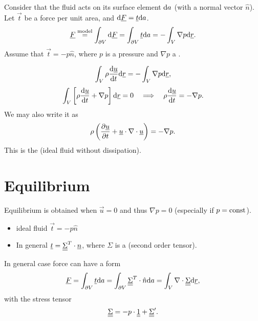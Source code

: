 \documentclass[../main.tex]{subfiles}
\begin{document}
    Consider that the fluid acts on its surface element $\mathrm{d} a$ (with a normal vector $\hat n$).
    Let $\vec t$ be a force per unit area, and $\mathrm{d} \underline{F} = \underline{t} \mathrm{d} a$.
    \begin{displaymath}
      \underline{F} \overset{\textrm{model}}{=} \int_{\partial V} \mathrm{d} \underline{F} 
      = \int_{\partial V}  \underline{t} \mathrm{d} a
      = - \int_V \nabla p \mathrm{d} \underline{r}.
    \end{displaymath}
    Assume that $\vec t = - p \hat{n}$, where $p $ is a pressure and $\nabla p $ a .
    
    \begin{displaymath}
      \int_V \rho \frac{\mathrm{d} \underline{u} }{\mathrm{d} t} \mathrm{d} \underline{r} = - \int_V \nabla p \mathrm{d} \underline{r},
    \end{displaymath}
    \begin{displaymath}
      \int_V \left[ \rho \frac{\mathrm{d} \underline{u}}{\mathrm{d} t} + \nabla p \right]\mathrm{d} \underline{r} = 0 
      \quad \Longrightarrow \quad \rho \frac{\mathrm{d}  \underline{u} }{\mathrm{d} t} = - \nabla p.
    \end{displaymath}
    We may also write it as 
    \begin{displaymath}
      \rho \left( \frac{\partial \underline{u}}{\partial t} + \underline{u} \cdot \nabla \cdot \underline{u}  \right) = - \nabla p.
    \end{displaymath}
    This is the  (ideal fluid without dissipation).
    
    \section{Equilibrium}
    Equilibrium is obtained when $\vec u = 0$ and thus $\nabla p = 0$
    (especially if $p = \textrm{const}$).
    \begin{itemize}
      \item ideal fluid $ \vec t = - p \hat n$
      \item In general $ \underline{t} = \underline{\underline{{\Sigma}}}^T \cdot \underline{n}$, where $\Sigma$ is a  (second order tensor).
    \end{itemize}
    In general case force can have a form 
    \begin{displaymath}
      \underline{F} = \int_{\partial V} \underline{t} \mathrm{d} a = \int_{\partial V} \underline{\underline{{\Sigma}}}^T \cdot \hat n \mathrm{d} a 
      = \int_V \nabla \cdot \underline{\underline{{\Sigma}}} \mathrm{d} \underline{r},
    \end{displaymath}
    with the stress tensor
    \begin{displaymath}
      \ten{\Sigma} = - p \cdot\ten{1} + \ten{\Sigma}'. %
    \end{displaymath}
\end{document}
